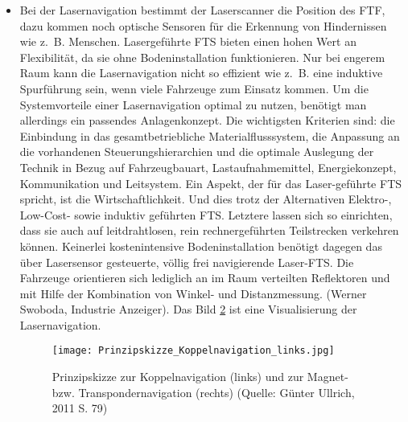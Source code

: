 \begin{itemize}
\begin{figure}[h!]
			\label{Prinzipskizze_Koppelnavigation_rechts}
	\end{figure}	
	\item Bei der Lasernavigation bestimmt der Laserscanner die Position des FTF, dazu kommen noch optische Sensoren f\"ur die Erkennung von Hindernissen wie z.~B. Menschen.
Lasergef\"uhrte FTS bieten einen hohen Wert an Flexibilit\"at, da sie ohne Bodeninstallation funktionieren.
Nur bei engerem Raum kann die Lasernavigation nicht so effizient wie z.~B. eine induktive Spurf\"uhrung sein, wenn viele Fahrzeuge zum Einsatz kommen.
Um die Systemvorteile einer Lasernavigation optimal zu nutzen, ben\"otigt man allerdings ein passendes Anlagenkonzept.
Die wichtigsten Kriterien sind: die Einbindung in das gesamtbetriebliche Materialflusssystem, die Anpassung an die vorhandenen Steuerungshierarchien und die optimale Auslegung der Technik in Bezug auf Fahrzeugbauart, Lastaufnahmemittel, Energiekonzept, Kommunikation und Leitsystem.
Ein Aspekt, der f\"ur das Laser-gef\"uhrte FTS spricht, ist die Wirtschaftlichkeit.
Und dies trotz der Alternativen Elektro-, Low-Cost- sowie induktiv gef\"uhrten FTS.
Letztere lassen sich so einrichten, dass sie auch auf leitdrahtlosen, rein rechnergef\"uhrten Teilstrecken verkehren k\"onnen.
Keinerlei kostenintensive Bodeninstallation ben\"otigt dagegen das \"uber Lasersensor gesteuerte, v\"ollig frei navigierende Laser-FTS.
Die Fahrzeuge orientieren sich lediglich an im Raum verteilten Reflektoren und mit Hilfe der Kombination von Winkel- und Distanzmessung. (Werner Swoboda, Industrie Anzeiger). Das Bild \ref{Prinzipskizze_Koppelnavigation_links} ist eine Visualisierung der Lasernavigation.
	\begin{figure}[h!]
		\centering
		\texttt{[image: Prinzipskizze\_Koppelnavigation\_links.jpg]}
		\caption{Prinzipskizze zur Koppelnavigation (links) und zur Magnet- bzw. Transpondernavigation (rechts) (Quelle: G\"unter Ullrich, 2011 S. 79)}
		\label{Prinzipskizze_Koppelnavigation_links}
	\end{figure}


\end{itemize}
